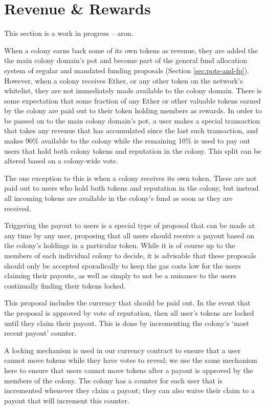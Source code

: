 \section{Revenue \& Rewards}\label{sec:revenue}

This section is a work in progress -- aron.


When a colony earns back some of its own tokens as revenue, they are added the the main colony domain's pot and become part of the general fund allocation system of regular and mandated funding proposals (Section \ref{sec:pots-and-fp}). However, when a colony receives Ether, or any other token on the network's whitelist, they are not immediately made available to the colony domain. There is some expectation that some fraction of any Ether or other valuable tokens earned by the colony are paid out to their token holding members as rewards. In order to be passed on to the main colony domain's pot, a user makes a special transaction that takes any revenue that has accumulated since the last such transaction, and makes 90\% available to the colony while the remaining 10\% is used to pay out users that hold both colony tokens and reputation in the colony. This split can be altered based on a colony-wide vote. 

The one exception to this is when a colony receives its own token. These are not paid out to users who hold both tokens and reputation in the colony, but instead all incoming tokens are available in the colony's fund as soon as they are received.

Triggering the payout to users is a special type of proposal that can be made at any time by any user, proposing that all users should receive a payout based on the colony's holdings in a particular token. While it is of course up to the members of each individual colony to decide, it is advisable that these proposals should only be accepted sporadically to keep the gas costs low for the users claiming their payouts, as well as simply to not be a nuisance to the users continually finding their tokens locked.

This proposal includes the currency that should be paid out. In the event that the proposal is approved by vote of reputation, then all user's tokens are locked until they claim their payout. This is done by incrementing the colony's `most recent payout' counter.

A locking mechanism is used in our currency contract to ensure that a user cannot move tokens while they have votes to reveal; we use the same mechanism here to ensure that users cannot move tokens after a payout is approved by the members of the colony. The colony has a counter for each user that is incremented whenever they claim a payout; they can also waive their claim to a payout that will increment this counter. 

